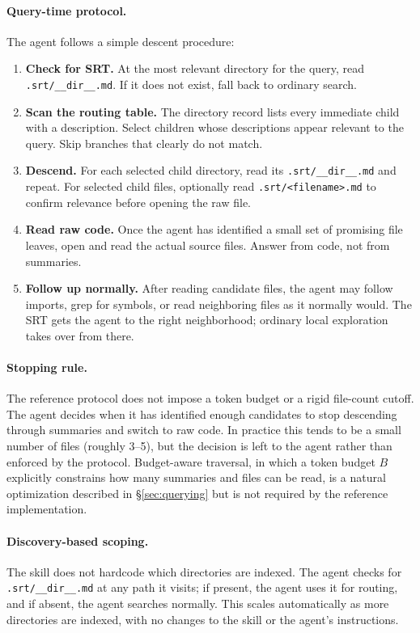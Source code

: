 \documentclass[11pt,a4paper]{article}
\newcommand{\srt}{\textsc{SRT}}
\newcommand{\tbudget}{B}
\begin{document}
\paragraph{Query-time protocol.}
The agent follows a simple descent procedure:
\begin{enumerate}[nosep]
    \item \textbf{Check for SRT.} At the most relevant directory for the query, read \texttt{.srt/\_\_dir\_\_.md}. If it does not exist, fall back to ordinary search.
    \item \textbf{Scan the routing table.} The directory record lists every immediate child with a description. Select children whose descriptions appear relevant to the query. Skip branches that clearly do not match.
    \item \textbf{Descend.} For each selected child directory, read its \texttt{.srt/\_\_dir\_\_.md} and repeat. For selected child files, optionally read \texttt{.srt/<filename>.md} to confirm relevance before opening the raw file.
    \item \textbf{Read raw code.} Once the agent has identified a small set of promising file leaves, open and read the actual source files. Answer from code, not from summaries.
    \item \textbf{Follow up normally.} After reading candidate files, the agent may follow imports, grep for symbols, or read neighboring files as it normally would. The \srt{} gets the agent to the right neighborhood; ordinary local exploration takes over from there.
\end{enumerate}

\paragraph{Stopping rule.}
The reference protocol does not impose a token budget or a rigid file-count cutoff.
The agent decides when it has identified enough candidates to stop descending through summaries and switch to raw code.
In practice this tends to be a small number of files (roughly 3--5), but the decision is left to the agent rather than enforced by the protocol.
Budget-aware traversal, in which a token budget $\tbudget$ explicitly constrains how many summaries and files can be read, is a natural optimization described in \S\ref{sec:querying} but is not required by the reference implementation.

\paragraph{Discovery-based scoping.}
The skill does not hardcode which directories are indexed.
The agent checks for \texttt{.srt/\_\_dir\_\_.md} at any path it visits; if present, the agent uses it for routing, and if absent, the agent searches normally.
This scales automatically as more directories are indexed, with no changes to the skill or the agent's instructions.
\end{document}
